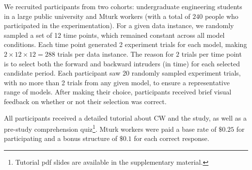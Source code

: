 \documentclass[letterpaper]{article} %
\newcommand{\kibitz}[2]{\ifnum\Comments=1{\textcolor{#1}{#2}}\fi}
\newcommand{\nh}[1]{\kibitz{blue}{[NH:#1]}}
\begin{document}
We recruited participants from two cohorts: undergraduate engineering students in a large public university
and Mturk workers (with a total of $240$ people who participated in the experimentation).
For a given data instance, we randomly sampled a set of 12 time points, which  remained constant across all model conditions.    
Each time point generated 2 experiment trials for each model, making $2 \times 12 \times 12=288$ trials per data instance. The reason for $2$ trials per time point is to select both the forward and backward intruders (in time) for each selected candidate period. Each participant saw 20 randomly sampled experiment trials, with no more than 2 trials from any given model, to ensure a representative range of models.  
After making their choice, participants received brief visual feedback on whether or not their selection was correct. 

All participants received a detailed tutorial about CW and the study, as well as a pre-study comprehension quiz\footnote{Tutorial pdf slides are available in the supplementary material.}. Mturk workers were paid a base rate of $\$0.25$ for participating and a bonus structure of $\$0.1$ for each correct response.


\end{document}
